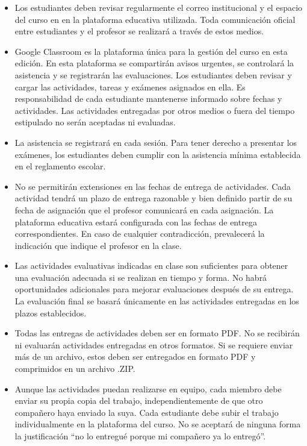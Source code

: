 \documentclass[
  coursetitle={Cómputo Nube y Tecnologías Emergentes},
  coursehours={96},
  coursedate={Verano 2026},
  doctype={Guía del curso},
  otherlangs={english,french},
  authorname={Lázaro},
  authorsurname={Bustio-Martínez},
  authortitle={PhD},
  role={Profesor Investigador},
  email={lbustio@inaoe.mx},
  phone={5559504000},
  ext={7459},
  institution={Instituto Nacional de Astrofísica, Óptica y Electrónica (INAOE)},
  department={Maestría en Ciencias en Tecnologías de Seguridad},
  address={Luis Enrique Erro 1, Sta. Ma. Tonantzintla, San Andrés Cholula, CP 72840, Puebla, México},
  margin={0.5in}
]{../../lbustio_lecture_notes}
\begin{document}
\begin{itemize}
  \item Los estudiantes deben revisar regularmente el correo institucional y el espacio del curso en en la plataforma educativa utilizada. Toda comunicación oficial entre estudiantes y el profesor se realizará a través de estos medios.
  \item Google Classroom es la plataforma única para la gestión del curso en esta edición. En esta plataforma se compartirán avisos urgentes, se controlará la asistencia y se registrarán las evaluaciones. Los estudiantes deben revisar y cargar las actividades, tareas y exámenes asignados en ella. Es responsabilidad de cada estudiante mantenerse informado sobre fechas y actividades. Las actividades entregadas por otros medios o fuera del tiempo estipulado no serán aceptadas ni evaluadas.
  \item La asistencia se registrará en cada sesión. Para tener derecho a presentar los exámenes, los estudiantes deben cumplir con la asistencia mínima establecida en el reglamento escolar.
  \item No se permitirán extensiones en las fechas de entrega de actividades. Cada actividad tendrá un plazo de entrega razonable y bien definido partir de su fecha de asignación que el profesor comunicará en cada asignación. La plataforma educativa estará configurada con las fechas de entrega correspondientes. En caso de cualquier contradicción, prevalecerá la indicación que indique el profesor en la clase.
  \item Las actividades evaluativas indicadas en clase son suficientes para obtener una evaluación adecuada si se realizan en tiempo y forma. No habrá oportunidades adicionales para mejorar evaluaciones después de su entrega. La evaluación final se basará únicamente en las actividades entregadas en los plazos establecidos.
  \item Todas las entregas de actividades deben ser en formato PDF. No se recibirán ni evaluarán actividades entregadas en otros formatos. Si se requiere enviar más de un archivo, estos deben ser entregados en formato PDF y comprimidos en un archivo .ZIP.
  \item Aunque las actividades puedan realizarse en equipo, cada miembro debe enviar su propia copia del trabajo, independientemente de que otro compañero haya enviado la suya. Cada estudiante debe subir el trabajo individualmente en la plataforma del curso. No se aceptará de ninguna forma la justificación “no lo entregué porque mi compañero ya lo entregó”.

\end{itemize}
\end{document}
